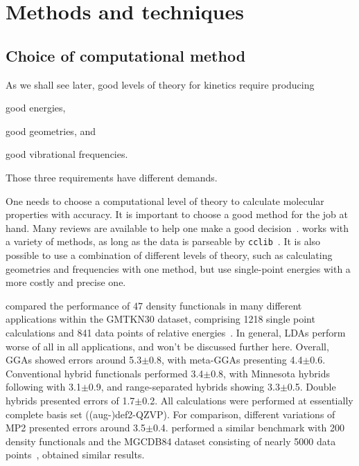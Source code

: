 \chapter{Methods and techniques}%
\label{ch:methods}

\section{Choice of computational method}

As we shall see later,
good levels of theory for kinetics
require producing
\begin{enumerate*}
	\item good energies,
	\item good geometries,
	      and
	\item good vibrational frequencies.
\end{enumerate*}
Those three requirements have different demands.

One needs to choose a computational level of theory to calculate
molecular properties with accuracy.
It is important to choose a good method for the job at hand.
Many reviews are available to help one make a good decision~\cite{Goerigk_2011,Goerigk_2019,Mardirossian_2017,Morgante_2020,Bursch_2022}.
\overreact{} works with a variety of methods,
as long as the data is parseable by \texttt{cclib}~\cite{O_boyle_2008}.
It is also possible to use a combination of different levels of theory,
such as calculating geometries and frequencies with one method,
but use single-point energies with a more costly and precise one.

\citeauthor{Goerigk_2011} compared the performance of 47 density functionals
in many different applications
within the GMTKN30 dataset,
comprising 1218 single point calculations
and 841 data points of relative energies~\cite{Goerigk_2011}.
In general,
LDAs perform worse of all in all applications,
and won't be discussed further here.
Overall,
GGAs showed errors around 5.3$\pm$0.8\kcalmol,
with meta-GGAs presenting 4.4$\pm$0.6\kcalmol.
Conventional hybrid functionals performed 3.4$\pm$0.8\kcalmol,
with Minnesota hybrids following with 3.1$\pm$0.9\kcalmol,
and range-separated hybrids showing 3.3$\pm$0.5\kcalmol.
Double hybrids presented errors of 1.7$\pm$0.2\kcalmol.
All calculations were performed at essentially complete basis set
((aug-)def2-QZVP).
For comparison,
different variations of MP2
presented errors around 3.5$\pm$0.4\kcalmol.
\citeauthor{Mardirossian_2017} performed a similar
benchmark with 200 density functionals and the MGCDB84 dataset
consisting of nearly 5000 data points~\cite{Mardirossian_2017},
obtained similar results.

